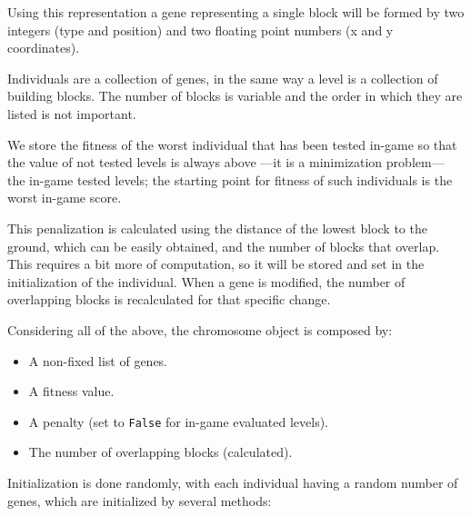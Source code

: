 \documentclass[a4paper,twoside]{article}
\begin{document}
Using this representation a gene representing a single block will be formed by two integers (type and position) and two floating point numbers (x and y coordinates).

Individuals are a collection of genes, in the same way a level is a collection 
of building blocks. The number of blocks is variable and the order in which 
they are listed is not important. 

We store the fitness of the worst individual that has been tested in-game so that the value of not tested levels is always above ---it is a minimization problem--- the in-game tested levels; the starting point for fitness of such individuals is the worst in-game score.

This penalization is calculated using the distance of the lowest block to the 
ground, which can be easily obtained, and the number of blocks that overlap. 
This requires a bit more of computation, so it will be stored and set in the 
initialization of the individual. When a gene is modified, the number of 
overlapping blocks is recalculated for that specific change.

Considering all of the above, the chromosome object is composed by:
\begin{itemize}
	\item A non-fixed list of genes.
	\item A fitness value.
	\item A penalty (set to {\tt False} for in-game evaluated levels).
	\item The number of overlapping blocks (calculated).
\end{itemize} %

Initialization is done randomly, with each individual having a random number of 
genes, which are initialized by several methods: 
\end{document}
